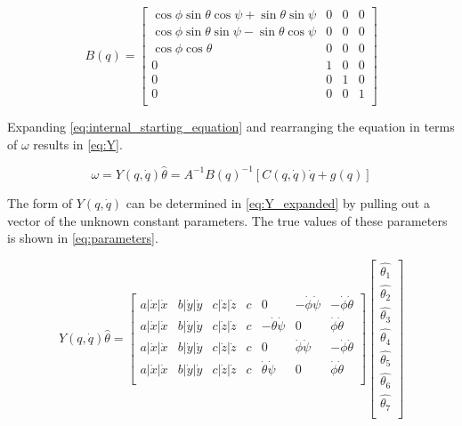 \documentclass[letterpaper,12pt,titlepage,oneside,final]{book}
\begin{document}
\begin{equation} \label{eq:b}
B(q) =
\begin{bmatrix}
\cos{\phi}\sin{\theta}\cos{\psi} + \sin{\theta}\sin{\psi} & 0 & 0 & 0 \\
\cos{\phi}\sin{\theta}\sin{\psi} - \sin{\theta}\cos{\psi} & 0 & 0 & 0 \\
\cos{\phi}\cos{\theta} & 0 & 0 & 0 \\
0 & 1 & 0 & 0 \\
0 & 0 & 1 & 0 \\
0 & 0 & 0 & 1 \\
\end{bmatrix}
\end{equation}

Expanding \eqref{eq:internal_starting_equation} and rearranging the equation in terms of $\omega$ results in \eqref{eq:Y}.

\begin{equation} \label{eq:Y} 
\omega = Y(q,\dot{q})\hat{\theta} = A^{-1}B(q)^{-1}[C(q,\dot{q})\dot{q} + g(q)]
\end{equation}

The form of $Y(q,\dot{q})$ can be determined in \eqref{eq:Y_expanded} by pulling out a vector of the unknown constant parameters. The true values of these parameters is shown in \eqref{eq:parameters}.

\begin{equation} \label{eq:Y_expanded} 
Y(q,\dot{q})\hat{\theta} =
\begin{bmatrix}
a|\dot{x}|\dot{x} & b|\dot{y}|\dot{y} & c|\dot{z}|\dot{z} & c & 0 & -\dot{\phi}\dot{\psi} & -\dot{\phi}\dot{\theta} \\
a|\dot{x}|\dot{x} & b|\dot{y}|\dot{y} & c|\dot{z}|\dot{z} & c & -\dot{\theta}\dot{\psi} & 0 & \dot{\phi}\dot{\theta} \\
a|\dot{x}|\dot{x} & b|\dot{y}|\dot{y} & c|\dot{z}|\dot{z} & c & 0 & \dot{\phi}\dot{\psi} & -\dot{\phi}\dot{\theta} \\
a|\dot{x}|\dot{x} & b|\dot{y}|\dot{y} & c|\dot{z}|\dot{z} & c & \dot{\theta}\dot{\psi} & 0 & \dot{\phi}\dot{\theta} \\
\end{bmatrix}
\begin{bmatrix}
\hat{\theta_{1}} \\
\hat{\theta_{2}} \\
\hat{\theta_{3}} \\
\hat{\theta_{4}} \\
\hat{\theta_{5}} \\
\hat{\theta_{6}} \\
\hat{\theta_{7}} \\
\end{bmatrix}
\end{equation}
\end{document}
